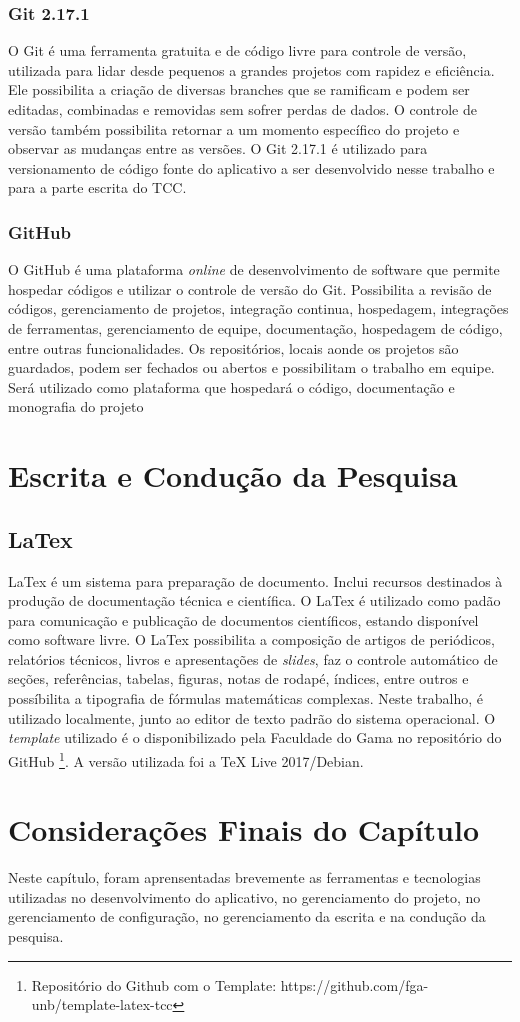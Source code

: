 \subsubsection{Git 2.17.1}

O Git \cite{git2020} é uma ferramenta gratuita e de código livre para controle 
de versão, utilizada para lidar desde pequenos a grandes projetos com rapidez e 
eficiência. Ele possibilita a criação de diversas branches que se ramificam e 
podem ser editadas, combinadas e removidas sem sofrer perdas de dados. O controle de 
versão também possibilita retornar a um momento específico do projeto e observar as 
mudanças entre as versões. O Git 2.17.1 é utilizado para versionamento de código fonte 
do aplicativo a ser desenvolvido nesse trabalho 
e para a parte escrita do TCC.


\subsubsection{GitHub}

O GitHub \cite{github2020} é uma plataforma \emph{online} de desenvolvimento de 
software que permite hospedar códigos e utilizar o controle de versão do Git. 
Possibilita a revisão de códigos, gerenciamento de projetos, integração continua, 
hospedagem, integrações de ferramentas, gerenciamento de equipe, documentação, 
hospedagem de código, entre outras funcionalidades. Os repositórios, locais 
aonde os projetos são guardados, podem ser fechados ou abertos e possibilitam o 
trabalho em equipe. Será utilizado como plataforma que hospedará o código, 
documentação e monografia do projeto

\section{Escrita e Condução da Pesquisa}

\subsection{LaTex}

LaTex \cite{latex2020} é um sistema para preparação de documento. Inclui 
recursos destinados à produção de documentação técnica e científica. O LaTex é 
utilizado como padão para comunicação e publicação de documentos científicos, estando 
disponível como software livre. O LaTex possibilita a composição de artigos de 
periódicos, relatórios técnicos, livros e apresentações de \emph{slides}, faz 
o controle automático de seções, referências, tabelas, figuras, notas de rodapé, 
índices, entre outros e possíbilita a tipografia de fórmulas matemáticas 
complexas. Neste trabalho, é utilizado localmente, junto ao editor de texto 
padrão do sistema operacional. O \emph{template} utilizado é o disponibilizado pela 
Faculdade do Gama no repositório do GitHub \footnote{Repositório do Github com o Template: https://github.com/fga-unb/template-latex-tcc}.
A versão utilizada foi a TeX Live 2017/Debian.

\section{Considerações Finais do Capítulo}

Neste capítulo, foram aprensentadas brevemente as ferramentas e tecnologias 
utilizadas no desenvolvimento do aplicativo, no gerenciamento 
do projeto, no gerenciamento de configuração, no gerenciamento da 
escrita e na condução da pesquisa.

